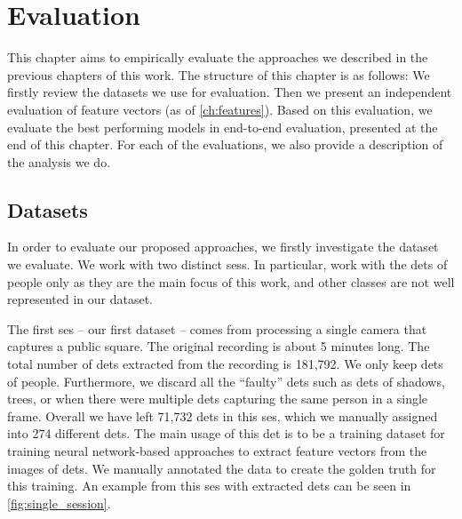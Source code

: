 \chapter{Evaluation}


\label{ch:evaluation}

This chapter aims to empirically evaluate the approaches we described
in the previous chapters of this work. The structure of this chapter is as follows:
We firstly review the datasets we use for evaluation. Then we present an independent
evaluation of feature vectors (as of \autoref{ch:features}). Based on this evaluation, 
we evaluate the best performing models in end-to-end evaluation, presented
at the end of this chapter. For each of the evaluations, we also provide a description of the analysis we do.

\section{Datasets}

\label{sec:datasets}

In order to evaluate our proposed approaches, we firstly investigate the dataset we evaluate. We work with two distinct \glspl{ses}. In particular, work with the \glspl{det} of people only as they are the main focus of this work, and other classes are not well represented in our dataset.

The first \gls{ses} -- our first dataset -- comes from processing a single camera that captures a public square. The original recording is about 5 minutes long. The total number of \glspl{det} extracted from the recording is 181,792. We only keep \glspl{det} of people. Furthermore, we discard all the ``faulty'' \glspl{det} such as \glspl{det} of shadows, trees, or when there were multiple \glspl{det} capturing the same person in a single frame. Overall we have left 71,732 \glspl{det} in this \gls{ses}, which we manually assigned into 274 different \glspl{det}. The main usage of this \gls{det} is to be a training dataset for training neural network-based approaches to extract feature vectors from the images of \glspl{det}. We manually annotated the data to create the golden truth for this training. An example from this \gls{ses} with extracted \glspl{det} can be seen in \autoref{fig:single_session}.

